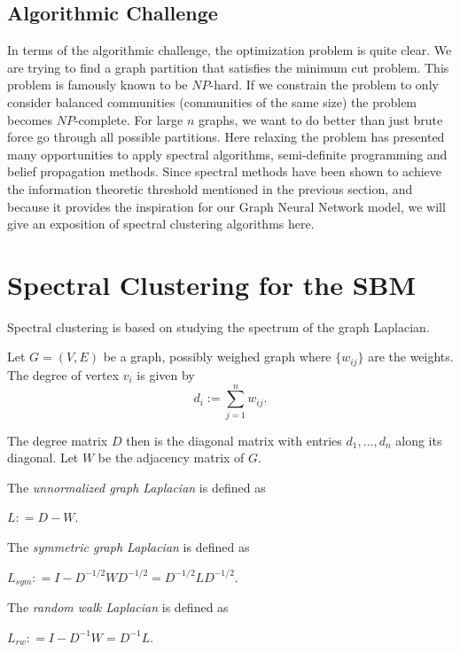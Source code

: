 \subsection{Algorithmic Challenge}

In terms of the algorithmic challenge, the optimization problem is quite clear.  We are trying to find a graph partition that satisfies the minimum cut problem.  This problem is famously known to be $NP$-hard. If we constrain the problem to only consider balanced communities (communities of the same size) the problem becomes $NP$-complete.  For large $n$ graphs, we want to do better than just brute force go through all possible partitions.  Here relaxing the problem has presented many opportunities to apply spectral algorithms, semi-definite programming and belief propagation methods.  Since spectral methods have been shown to achieve the information theoretic threshold mentioned in the previous section, and because it provides the inspiration for our Graph Neural Network model, we will give an exposition of spectral clustering algorithms here.  

\section{Spectral Clustering for the SBM}

Spectral clustering is based on studying the spectrum of the graph Laplacian.  


Let $G= (V, E)$ be a graph, possibly weighed graph where $\{w_{ij}\}$ are the weights.  The degree of vertex $v_i$ is given by 
$$ d_i := \sum_{j=1}^n w_{ij}.$$

The degree matrix $D$ then is the diagonal matrix with entries $d_1, ..., d_n$ along its diagonal. Let $W$ be the adjacency matrix of $G$.  

\begin{definition}The \textit{unnormalized graph Laplacian} is defined as

$L : = D-W.$ 
\end{definition}
\begin{definition}The \textit{symmetric graph Laplacian} is defined as

$L_{sym} : = I - D^{-1/2}WD^{-1/2} = D^{-1/2}LD^{-1/2}.$ 
\end{definition}
\begin{definition}The \textit{random walk Laplacian} is defined as

$L_{rw} : = I - D^{-1}W = D^{-1}L.$ 
\end{definition}

